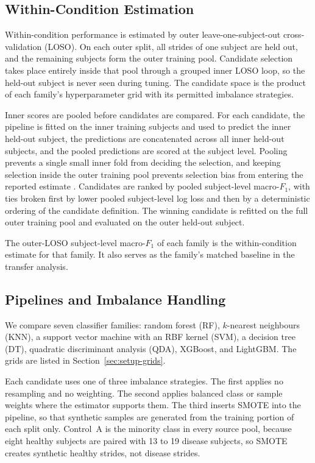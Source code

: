 \documentclass[conference]{IEEEtran}
\begin{document}
\subsection{Within-Condition Estimation}
\label{sec:method-within}
Within-condition performance is estimated by outer leave-one-subject-out cross-validation (LOSO). On each outer split, all strides of one subject are held out, and the remaining subjects form the outer training pool. Candidate selection takes place entirely inside that pool through a grouped inner LOSO loop, so the held-out subject is never seen during tuning. The candidate space is the product of each family's hyperparameter grid with its permitted imbalance strategies.

Inner scores are pooled before candidates are compared. For each candidate, the pipeline is fitted on the inner training subjects and used to predict the inner held-out subject, the predictions are concatenated across all inner held-out subjects, and the pooled predictions are scored at the subject level. Pooling prevents a single small inner fold from deciding the selection, and keeping selection inside the outer training pool prevents selection bias from entering the reported estimate \cite{cawley2010overfitting}. Candidates are ranked by pooled subject-level macro-$F_1$, with ties broken first by lower pooled subject-level log loss and then by a deterministic ordering of the candidate definition. The winning candidate is refitted on the full outer training pool and evaluated on the outer held-out subject.

The outer-LOSO subject-level macro-$F_1$ of each family is the within-condition estimate for that family. It also serves as the family's matched baseline in the transfer analysis.

\subsection{Pipelines and Imbalance Handling}
We compare seven classifier families: random forest (RF), $k$-nearest neighbours (KNN), a support vector machine with an RBF kernel (SVM), a decision tree (DT), quadratic discriminant analysis (QDA), XGBoost, and LightGBM. The grids are listed in Section~\ref{sec:setup-grids}.

Each candidate uses one of three imbalance strategies. The first applies no resampling and no weighting. The second applies balanced class or sample weights where the estimator supports them. The third inserts SMOTE \cite{chawla2002smote} into the pipeline, so that synthetic samples are generated from the training portion of each split only. Control~A is the minority class in every source pool, because eight healthy subjects are paired with 13 to 19 disease subjects, so SMOTE creates synthetic healthy strides, not disease strides.
\end{document}
